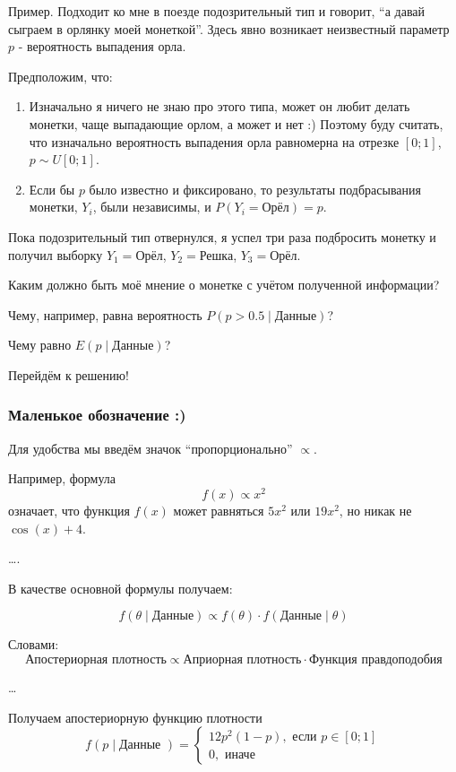 \documentclass[11pt,russian,]{article}
\begin{document}
Пример. Подходит ко мне в поезде подозрительный тип и говорит, ``а давай
сыграем в орлянку моей монеткой''. Здесь явно возникает неизвестный
параметр \(p\) - вероятность выпадения орла.

Предположим, что:

\begin{enumerate}
\def\labelenumi{\arabic{enumi}.}
\item
  Изначально я ничего не знаю про этого типа, может он любит делать
  монетки, чаще выпадающие орлом, а может и нет :) Поэтому буду считать,
  что изначально вероятность выпадения орла равномерна на отрезке
  \([0;1]\), \(p \sim U[0;1]\).
\item
  Если бы \(p\) было известно и фиксировано, то результаты подбрасывания
  монетки, \(Y_i\), были независимы, и \(P(Y_i = \text{Орёл})=p\).
\end{enumerate}

Пока подозрительный тип отвернулся, я успел три раза подбросить монетку
и получил выборку \(Y_1=\text{Орёл}\), \(Y_2=\text{Решка}\),
\(Y_3=\text{Орёл}\).

Каким должно быть моё мнение о монетке с учётом полученной информации?

Чему, например, равна вероятность \(P(p>0.5 \mid \text{Данные})\)?

Чему равно \(E(p \mid \text{Данные})\)?

Перейдём к решению!

\subsubsection{Маленькое обозначение :)}\label{-}

Для удобства мы введём значок ``пропорционально'' \(\propto\).

Например, формула \[
f(x) \propto x^2
\] означает, что функция \(f(x)\) может равняться \(5x^2\) или
\(19x^2\), но никак не \(\cos(x)+4\).

\ldots{}.

В качестве основной формулы получаем:

\[
f(\theta \mid \text{Данные}) \propto f(\theta) \cdot f(\text{Данные} \mid \theta)
\]

Словами: \[
\text{Апостериорная плотность} \propto \text{Априорная плотность} \cdot \text{Функция правдоподобия}
\]

\ldots{}

Получаем апостериорную функцию плотности \[
f(p \mid \text{Данные }) =
\begin{cases}
12p^2 (1-p), \text{ если } p \in [0;1] \\
0, \text{ иначе}
\end{cases}
\]
\end{document}
